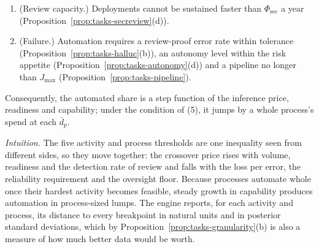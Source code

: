 \begin{proposition}[Breakpoints]
\begin{enumerate}
\item[(8)] (Review capacity.) Deployments cannot be sustained faster than $\Phi_{\mathrm{sec}}$ a year (Proposition~\ref{prop:tasks-secreview}(d)).
\item[(9)] (Failure.) Automation requires a review-proof error rate within tolerance (Proposition~\ref{prop:tasks-halluc}(b)), an autonomy level within the risk appetite (Proposition~\ref{prop:tasks-autonomy}(d)) and a pipeline no longer than $J_{\max}$ (Proposition~\ref{prop:tasks-pipeline}).
\end{enumerate}
Consequently, the automated share is a step function of the inference price, readiness and capability; under the condition of (5), it jumps by a whole process's spend at each $\bar d_p$.
\end{proposition}

\noindent\emph{Intuition.} The five activity and process thresholds are one inequality seen from different sides, so they move together: the crossover price rises with volume, readiness and the detection rate of review and falls with the loss per error, the reliability requirement and the oversight floor. Because processes automate whole once their hardest activity becomes feasible, steady growth in capability produces automation in process-sized lumps. The engine reports, for each activity and process, its distance to every breakpoint in natural units and in posterior standard deviations, which by Proposition~\ref{prop:tasks-granularity}(b) is also a measure of how much better data would be worth.
